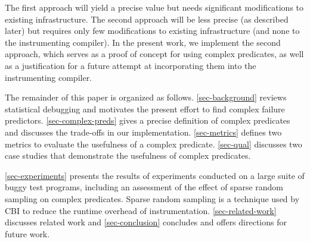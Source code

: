 The first approach will yield a precise value but needs significant modifications to existing infrastructure.  The second approach will be less precise (as described later) but requires only few modifications to existing infrastructure (and none to the instrumenting compiler).  In the present work, we implement the second approach, which serves as a proof of concept for using complex predicates, as well as a justification for a future attempt at incorporating them into the instrumenting compiler.

The remainder of this paper is organized as follows.  \autoref{sec-background} reviews statistical debugging and motivates the present effort to find complex failure predictors.  \autoref{sec-complex-preds} gives a precise definition of complex predicates and discusses the trade-offs in our implementation.  \autoref{sec-metrics} defines two metrics to evaluate the usefulness of a complex predicate.  \autoref{sec-qual} discusses two case studies that demonstrate the usefulness of complex predicates.

\autoref{sec-experiments} presents the results of experiments conducted on a large suite of buggy test programs, including an assessment of the effect of sparse random sampling on complex predicates.  Sparse random sampling is a technique used by CBI to reduce the runtime overhead of instrumentation.  \autoref{sec-related-work} discusses related work and \autoref{sec-conclusion} concludes and offers directions for future work.

